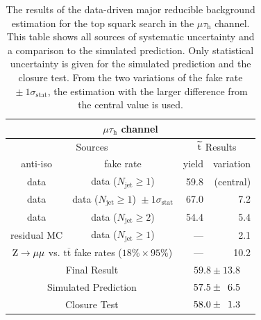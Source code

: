 \documentclass[12pt]{thesis}  %
\newcommand{\tauh}{\ensuremath{\tau_{\text{h}}}\xspace}
\newcommand{\mutau}{\ensuremath{\mu\tauh}\xspace}
\renewcommand{\ttbar}{\ensuremath{\mathrm{t}\overline{\mathrm{t}}}\xspace}
\newcommand{\ra}{\ensuremath{\rightarrow}}%
\newcommand{\Zmm}{\ensuremath{\Z \ra \mu\mu}\xspace}%
\begin{document}
\begin{table}[hbt]
  \begin{center}
    \begin{tabular}{|c|c|r|r|}
      \multicolumn{4}{c}{\mutau channel} \\
      \hline
      \multicolumn{2}{|c|}{Sources} & \multicolumn{2}{c|}{$\widetilde{\mathrm{t}}$ Results} \\
      \hline
      anti-iso    & fake rate                                                    & \multicolumn{1}{c|}{yield}  & \multicolumn{1}{c|}{variation}\\
      \hline
      data        & data ($N_{\text{jet}} \geq 1$)                               & 59.8 & (central) \\
      data        & data ($N_{\text{jet}} \geq 1$) ${}\pm 1\sigma_{\text{stat}}$ & 67.0 & 7.2 \\
      data        & data ($N_{\text{jet}} \geq 2$)                               & 54.4 & 5.4     \\
      residual MC & data ($N_{\text{jet}} \geq 1$)                               & ---  & 2.1      \\
      \multicolumn{2}{|c|}{\Zmm vs. \ttbar fake rates ($18\%\times95\%$)}        & ---  & 10.2 \\
      \hline
      \multicolumn{2}{|c|}{Final Result}         & \multicolumn{2}{c|}{$59.8 \pm 13.8$}\\
      \multicolumn{2}{|c|}{Simulated Prediction} & \multicolumn{2}{c|}{$57.5 \pm \hphantom{1}6.5$} \\
      \multicolumn{2}{|c|}{Closure Test}         & \multicolumn{2}{c|}{$58.0 \pm \hphantom{1}1.3$} \\
      \hline
    \end{tabular}
    \caption{The results of the data-driven major reducible background estimation for the top squark search in the \mutau channel. This table shows all sources of systematic uncertainty and a comparison to the simulated prediction. Only statistical uncertainty is given for the simulated prediction and the closure test. From the two variations of the fake rate ${}\pm 1\sigma_{\text{stat}}$, the estimation with the larger difference from the central value is used.}
    \label{Bkg:tab:faketauresultsmutauLQD}
  \end{center}
\end{table}
\end{document}
